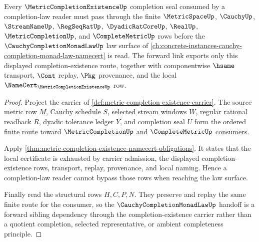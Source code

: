 \begin{theorem}
\label{thm:metric-completion-existence-cauchy-completion-monad-law-forward-link}
Every $\MetricCompletionExistenceUp$ completion seal consumed by a completion-law reader must pass through the finite $\MetricSpaceUp$, $\CauchyUp$, $\StreamNameUp$, $\RegSeqRatUp$, $\DyadicRatCoreUp$, $\RealUp$, $\MetricCompletionUp$, and $\CompleteMetricUp$ rows before the $\CauchyCompletionMonadLawUp$ law surface of \autoref{ch:concrete-instances-cauchy-completion-monad-law-namecert} is read. The forward link exports only this displayed completion-existence route, together with componentwise $\hsame$ transport, $\Cont$ replay, $\Pkg$ provenance, and the local $\NameCert_{\MetricCompletionExistenceUp}$ row.
\end{theorem}
\begin{proof}
Project the carrier of \autoref{def:metric-completion-existence-carrier}. The source metric row $M$, Cauchy schedule $S$, selected stream windows $W$, regular rational readback $R$, dyadic tolerance ledger $Y$, and completion seal $U$ form the ordered finite route toward $\MetricCompletionUp$ and $\CompleteMetricUp$ consumers.

Apply \autoref{thm:metric-completion-existence-namecert-obligations}. It states that the local certificate is exhausted by carrier admission, the displayed completion-existence rows, transport, replay, provenance, and local naming. Hence a completion-law reader cannot bypass those rows when reaching the law surface.

Finally read the structural rows $H,C,P,N$. They preserve and replay the same finite route for the consumer, so the $\CauchyCompletionMonadLawUp$ handoff is a forward sibling dependency through the completion-existence carrier rather than a quotient completion, selected representative, or ambient completeness principle.
\end{proof}
